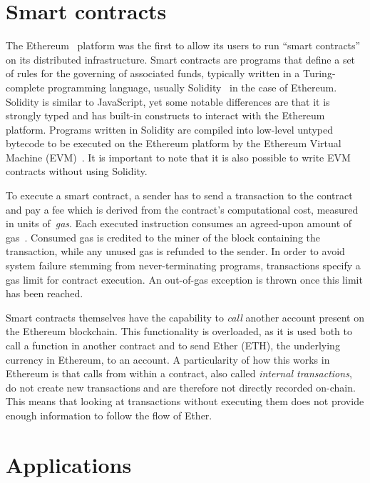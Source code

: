 \section{Smart contracts}
The Ethereum~\cite{buterin2014} platform was the first to allow its users to run ``smart contracts'' on its distributed infrastructure.
Smart contracts are programs that define a set of rules for the governing of associated funds, typically written in a Turing-complete programming language, usually Solidity~\cite{Dannen:2017:IES:3103305} in the case of Ethereum.
Solidity is similar to JavaScript, yet some notable differences are that it is strongly typed and has built-in constructs to interact with the Ethereum platform.
Programs written in Solidity are compiled into low-level untyped bytecode to be executed on the Ethereum platform by the Ethereum Virtual Machine (EVM)~\cite{wood2014ethereum}.
It is important to note that it is also possible to write EVM contracts without using Solidity.

To execute a smart contract, a sender has to send a transaction to the contract and pay a fee which is derived from the contract's computational cost, measured in units of~\emph{gas}. Each executed instruction consumes an agreed-upon amount of gas~\cite{wood2014ethereum}. Consumed gas is credited to the miner of the block containing the transaction, while any unused gas is refunded to the sender. In order to avoid system failure stemming from never-terminating programs, transactions specify a gas limit for contract execution. An out-of-gas exception is thrown once this limit has been reached.

Smart contracts themselves have the capability to \emph{call} another account present on the Ethereum blockchain. This functionality is overloaded, as it is used both to call a function in another contract and to send Ether (ETH), the underlying currency in Ethereum, to an account. A particularity of how this works in Ethereum is that calls from within a contract, also called \emph{internal transactions}, do not create new transactions and are therefore not directly recorded on-chain. This means that looking at transactions without executing them does not provide enough information to follow the flow of Ether.


\section{Applications}

